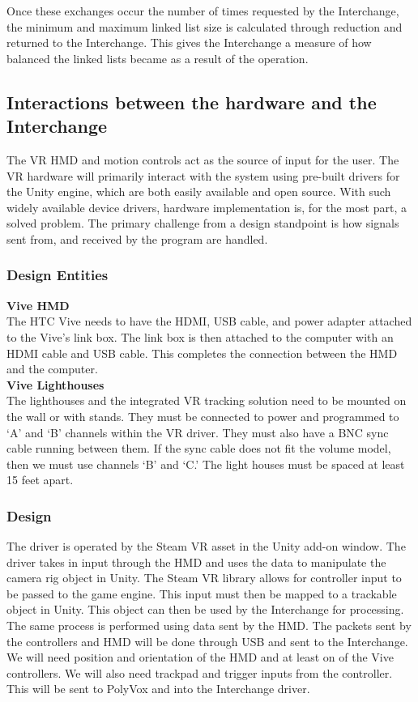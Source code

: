 \documentclass[onecolumn, draftclsnofoot,10pt, compsoc]{IEEEtran}
\begin{document}
Once these exchanges occur the number of times requested by the Interchange, the minimum and maximum linked list size is calculated through reduction and returned to the Interchange. This gives the Interchange a measure of how balanced the linked lists became as a result of the operation.

\subsection{Interactions between the hardware and the Interchange}
The VR HMD and motion controls act as the source of input for the user. The VR hardware will primarily interact with the system using pre-built drivers for the Unity engine, which are both easily available and open source. With such widely available device drivers, hardware implementation is, for the most part, a solved problem. The primary challenge from a design standpoint is how signals sent from, and received by the program are handled.

\subsubsection{Design Entities}
\textbf{Vive HMD} \\
The HTC Vive needs to have the HDMI, USB cable, and power adapter attached to the Vive's link box. The link box is then attached to the computer with an HDMI cable and USB cable. This completes the connection between the HMD and the computer.\\
\textbf{Vive Lighthouses} \\
The lighthouses and the integrated VR tracking solution need to be mounted on the wall or with stands. They must be connected to power and programmed to ‘A’ and ‘B’ channels within the VR driver. They must also have a BNC sync cable running between them. If the sync cable does not fit the volume model, then we must use channels ‘B’ and ‘C.’ The light houses must be spaced at least 15 feet apart. 
\subsubsection{Design} 
The driver is operated by the Steam VR asset in the Unity add-on window. The driver takes in input through the HMD and uses the data to manipulate the camera rig object in Unity. The Steam VR library allows for controller input to be passed to the game engine. This input must then be mapped to a trackable object in Unity. This object can then be used by the Interchange for processing. The same process is performed using data sent by the HMD. The packets sent by the controllers and HMD will be done through USB and sent to the Interchange. We will need position and orientation of the HMD and at least on of the Vive controllers. We will also need trackpad and trigger inputs from the controller. This will be sent to PolyVox and into the Interchange driver.
\end{document}
